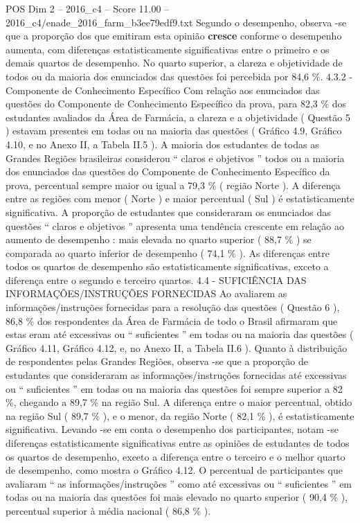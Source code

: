 \begin{textsample}{POS Dim 2 – 2016\_c4 – Score 11.00 – 2016\_c4/enade\_2016\_farm\_b3ee79edf9.txt}
Segundo o desempenho, observa -se que a proporção dos que emitiram esta opinião \textbf{cresce} conforme o desempenho aumenta, com diferenças estatisticamente significativas entre o primeiro e os demais quartos de desempenho.
No quarto superior, a clareza e objetividade de todos ou da maioria dos enunciados das questões foi percebida por 84,6 \%. 4.3.2 - Componente de Conhecimento Específico Com relação aos enunciados das questões do Componente de Conhecimento Específico da prova, para 82,3 \% dos estudantes avaliados da Área de Farmácia, a clareza e a objetividade ( Questão 5 ) estavam presentes em todas ou na maioria das questões ( Gráfico 4.9, Gráfico 4.10, e no Anexo II, a Tabela II.5 ).
A maioria dos estudantes de todas as Grandes Regiões brasileiras considerou “ claros e objetivos ” todos ou a maioria dos enunciados das questões do Componente de Conhecimento Específico da prova, percentual sempre maior ou igual a 79,3 \% ( região Norte ).
A diferença entre as regiões com menor ( Norte ) e maior percentual ( Sul ) é estatisticamente significativa.
A proporção de estudantes que consideraram os enunciados das questões “ claros e objetivos ” apresenta uma tendência crescente em relação ao aumento de desempenho : mais elevada no quarto superior ( 88,7 \% ) se comparada ao quarto inferior de desempenho ( 74,1 \% ).
As diferenças entre todos os quartos de desempenho são estatisticamente significativas, exceto a diferença entre o segundo e terceiro quartos. 4.4 - SUFICIÊNCIA DAS INFORMAÇÕES/INSTRUÇÕES FORNECIDAS Ao avaliarem as informações/instruções fornecidas para a resolução das questões ( Questão 6 ), 86,8 \% dos respondentes da Área de Farmácia de todo o Brasil afirmaram que estas eram até excessivas ou “ suficientes ” em todas ou na maioria das questões ( Gráfico 4.11, Gráfico 4.12, e, no Anexo II, a Tabela II.6 ).
Quanto à distribuição de respondentes pelas Grandes Regiões, observa -se que a proporção de estudantes que consideraram as informações/instruções fornecidas até excessivas ou “ suficientes ” em todas ou na maioria das questões foi sempre superior a 82 \%, chegando a 89,7 \% na região Sul.
A diferença entre o maior percentual, obtido na região Sul ( 89,7 \% ), e o menor, da região Norte ( 82,1 \% ), é estatisticamente significativa.
Levando -se em conta o desempenho dos participantes, notam -se diferenças estatisticamente significativas entre as opiniões de estudantes de todos os quartos de desempenho, exceto a diferença entre o terceiro e o melhor quarto de desempenho, como mostra o Gráfico 4.12.
O percentual de participantes que avaliaram “ as informações/instruções ” como até excessivas ou “ suficientes ” em todas ou na maioria das questões foi mais elevado no quarto superior ( 90,4 \% ), percentual superior à média nacional ( 86,8 \% ).

\end{textsample}
